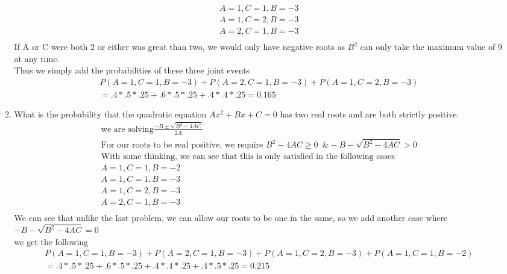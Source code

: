 \documentclass[11pt]{article}
\begin{document}
\begin{enumerate}
\begin{enumerate}
\begin{gather}
			A=1,C=1,B=-3\\
			A=1,C=2,B=-3\\
			A=2,C=1,B=-3\\
			\end{gather}
			If A or C were both 2 or either was great than two, we would only have negative roots as $B^2$ can only take the maximum value of 9 at any time.\\
			Thus we simply add the probabilities of these three joint events
			\begin{gather}
			P(A=1,C=1,B=-3)+P(A=2,C=1,B=-3)+P(A=1,C=2,B=-3)\\
			= .4*.5*.25+.6*.5*.25+.4*.4*.25 = 0.165
			\end{gather}
			\item What is the probability that the quadratic equation  $Ax^2+Bx+C=0$
			has two real roots and are both strictly positive.
			\begin{gather}
			\text{we are solving} \frac{-B \pm \sqrt{B^2-4AC}}{2A}\\
			\text{For our roots to be real positive, we require } B^2-4AC \ge 0 \, \, \, \& -B - \sqrt{B^2-4AC} > 0\\
			\text{With some thinking, we can see that this is only satisfied in the following cases}\\
			A=1,C=1,B=-2\\
			A=1,C=1,B=-3\\
			A=1,C=2,B=-3\\
			A=2,C=1,B=-3\\
			\end{gather}
			We can see that unlike the last problem, we can allow our roots to be one in the same, so we add another case where $-B - \sqrt{B^2-4AC} = 0$\\
			we get the following
			\begin{gather}
			P(A=1,C=1,B=-3)+P(A=2,C=1,B=-3)+P(A=1,C=2,B=-3)+P(A=1,C=1,B=-2)\\
			= .4*.5*.25+.6*.5*.25+.4*.4*.25+.4*.5*.25 = 0.215
			\end{gather}
		\end{enumerate}
	\end{enumerate}
\end{document}
